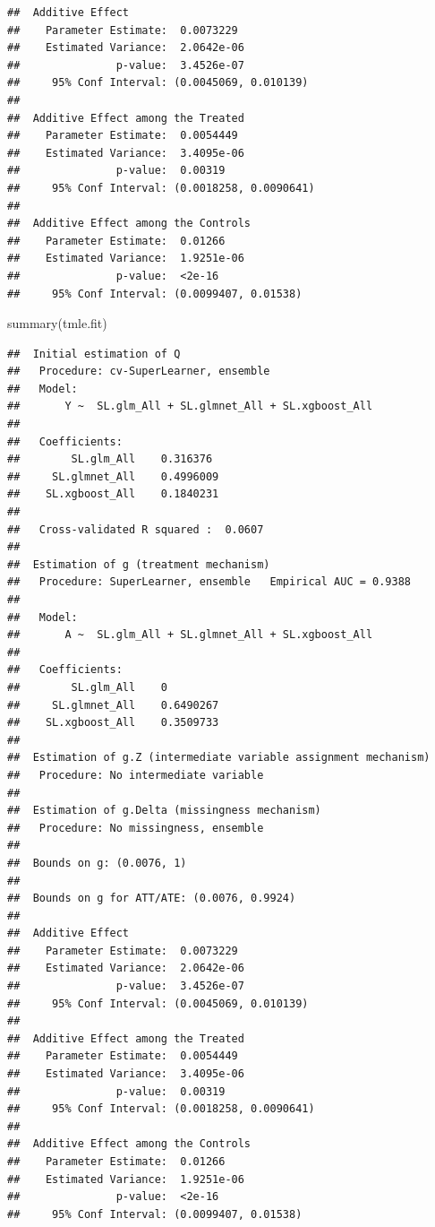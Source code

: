 \documentclass[
]{book}
\newenvironment{Shaded}{\begin{snugshade}}{\end{snugshade}}
\newcommand{\FunctionTok}[1]{\textcolor[rgb]{0.00,0.00,0.00}{#1}}
\newcommand{\NormalTok}[1]{#1}
\begin{document}
\begin{verbatim}
##  Additive Effect
##    Parameter Estimate:  0.0073229
##    Estimated Variance:  2.0642e-06
##               p-value:  3.4526e-07
##     95% Conf Interval: (0.0045069, 0.010139) 
## 
##  Additive Effect among the Treated
##    Parameter Estimate:  0.0054449
##    Estimated Variance:  3.4095e-06
##               p-value:  0.00319
##     95% Conf Interval: (0.0018258, 0.0090641) 
## 
##  Additive Effect among the Controls
##    Parameter Estimate:  0.01266
##    Estimated Variance:  1.9251e-06
##               p-value:  <2e-16
##     95% Conf Interval: (0.0099407, 0.01538)
\end{verbatim}

\begin{Shaded}
\begin{Highlighting}[]
\FunctionTok{summary}\NormalTok{(tmle.fit)}
\end{Highlighting}
\end{Shaded}

\begin{verbatim}
##  Initial estimation of Q
##   Procedure: cv-SuperLearner, ensemble
##   Model:
##       Y ~  SL.glm_All + SL.glmnet_All + SL.xgboost_All
## 
##   Coefficients: 
##        SL.glm_All    0.316376 
##     SL.glmnet_All    0.4996009 
##    SL.xgboost_All    0.1840231 
## 
##   Cross-validated R squared :  0.0607 
## 
##  Estimation of g (treatment mechanism)
##   Procedure: SuperLearner, ensemble   Empirical AUC = 0.9388 
## 
##   Model:
##       A ~  SL.glm_All + SL.glmnet_All + SL.xgboost_All 
## 
##   Coefficients: 
##        SL.glm_All    0 
##     SL.glmnet_All    0.6490267 
##    SL.xgboost_All    0.3509733 
## 
##  Estimation of g.Z (intermediate variable assignment mechanism)
##   Procedure: No intermediate variable 
## 
##  Estimation of g.Delta (missingness mechanism)
##   Procedure: No missingness, ensemble
## 
##  Bounds on g: (0.0076, 1) 
## 
##  Bounds on g for ATT/ATE: (0.0076, 0.9924) 
## 
##  Additive Effect
##    Parameter Estimate:  0.0073229
##    Estimated Variance:  2.0642e-06
##               p-value:  3.4526e-07
##     95% Conf Interval: (0.0045069, 0.010139) 
## 
##  Additive Effect among the Treated
##    Parameter Estimate:  0.0054449
##    Estimated Variance:  3.4095e-06
##               p-value:  0.00319
##     95% Conf Interval: (0.0018258, 0.0090641) 
## 
##  Additive Effect among the Controls
##    Parameter Estimate:  0.01266
##    Estimated Variance:  1.9251e-06
##               p-value:  <2e-16
##     95% Conf Interval: (0.0099407, 0.01538)
\end{verbatim}
\end{document}
